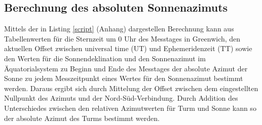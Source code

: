 \subsection{Berechnung des absoluten Sonnenazimuts}
Mittels der in Listing \ref{script} (Anhang) dargestellen Berechnung kann aus Tabellenwerten für die Sternzeit um 0 Uhr des Messtages in Greenwich, den aktuellen Offset zwischen universal time (UT) und Ephemeridenzeit (TT) sowie den Werten für die Sonnendeklination und den Sonnenazimut im Äquatorialsystem zu Beginn und Ende des Messtages der absolute Azimut der Sonne zu jedem Messzeitpunkt eines Wertes für den Sonnenazimut bestimmt werden. Daraus ergibt sich durch Mittelung der Offset zwischen dem eingestellten Nullpunkt des Azimuts und der Nord-Süd-Verbindung. 
Durch Addition des Unterschiedes zwischen den relativen Azimutwerten für Turm und Sonne kann so der absolute Azimut des Turms bestimmt werden. 